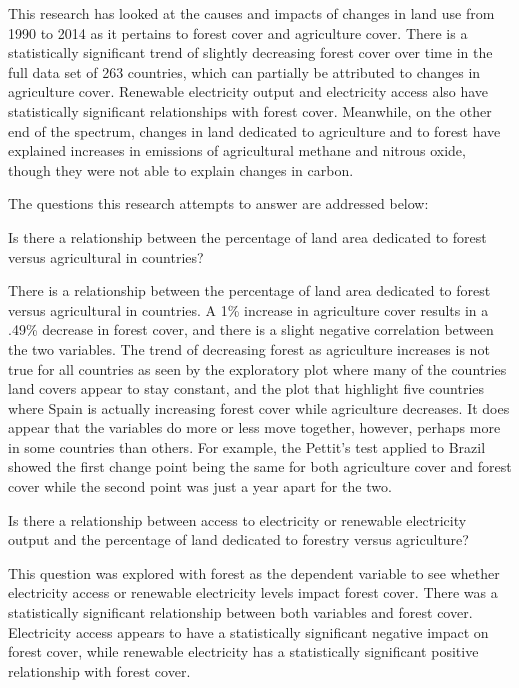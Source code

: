 \documentclass[12pt,]{article}
\begin{document}
This research has looked at the causes and impacts of changes in land
use from 1990 to 2014 as it pertains to forest cover and agriculture
cover. There is a statistically significant trend of slightly decreasing
forest cover over time in the full data set of 263 countries, which can
partially be attributed to changes in agriculture cover. Renewable
electricity output and electricity access also have statistically
significant relationships with forest cover. Meanwhile, on the other end
of the spectrum, changes in land dedicated to agriculture and to forest
have explained increases in emissions of agricultural methane and
nitrous oxide, though they were not able to explain changes in carbon.

The questions this research attempts to answer are addressed below:

Is there a relationship between the percentage of land area dedicated to
forest versus agricultural in countries?

There is a relationship between the percentage of land area dedicated to
forest versus agricultural in countries. A 1\% increase in agriculture
cover results in a .49\% decrease in forest cover, and there is a slight
negative correlation between the two variables. The trend of decreasing
forest as agriculture increases is not true for all countries as seen by
the exploratory plot where many of the countries land covers appear to
stay constant, and the plot that highlight five countries where Spain is
actually increasing forest cover while agriculture decreases. It does
appear that the variables do more or less move together, however,
perhaps more in some countries than others. For example, the Pettit's
test applied to Brazil showed the first change point being the same for
both agriculture cover and forest cover while the second point was just
a year apart for the two.

Is there a relationship between access to electricity or renewable
electricity output and the percentage of land dedicated to forestry
versus agriculture?

This question was explored with forest as the dependent variable to see
whether electricity access or renewable electricity levels impact forest
cover. There was a statistically significant relationship between both
variables and forest cover. Electricity access appears to have a
statistically significant negative impact on forest cover, while
renewable electricity has a statistically significant positive
relationship with forest cover.
\end{document}
